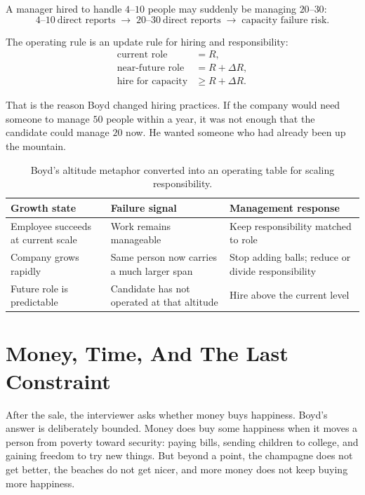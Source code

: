 A manager hired to handle \(4\text{--}10\) people may suddenly be managing \(20\text{--}30\):
\begin{equation}
4\text{--}10\ \text{direct reports}
\;\longrightarrow\;
20\text{--}30\ \text{direct reports}
\;\longrightarrow\;
\text{capacity failure risk}.
\end{equation}

The operating rule is an update rule for hiring and responsibility:
\begin{align}
\text{current role} &= R,\\
\text{near-future role} &= R + \Delta R,\\
\text{hire for capacity} &\geq R + \Delta R.
\end{align}

That is the reason Boyd changed hiring practices. If the company would need someone to manage \(50\) people within a year, it was not enough that the candidate could manage \(20\) now. He wanted someone who had already been up the mountain.

\begin{table}
\centering
\begin{tabular}{|p{.24\linewidth}|p{.28\linewidth}|p{.36\linewidth}|}
\hline
\textbf{Growth state} & \textbf{Failure signal} & \textbf{Management response} \\
\hline
Employee succeeds at current scale & Work remains manageable & Keep responsibility matched to role \\
\hline
Company grows rapidly & Same person now carries a much larger span & Stop adding balls; reduce or divide responsibility \\
\hline
Future role is predictable & Candidate has not operated at that altitude & Hire above the current level \\
\hline
\end{tabular}
\caption{Boyd's altitude metaphor converted into an operating table for scaling responsibility.}
\end{table}

\section{Money, Time, And The Last Constraint}

After the sale, the interviewer asks whether money buys happiness. Boyd's answer is deliberately bounded. Money does buy some happiness when it moves a person from poverty toward security: paying bills, sending children to college, and gaining freedom to try new things. But beyond a point, the champagne does not get better, the beaches do not get nicer, and more money does not keep buying more happiness.

